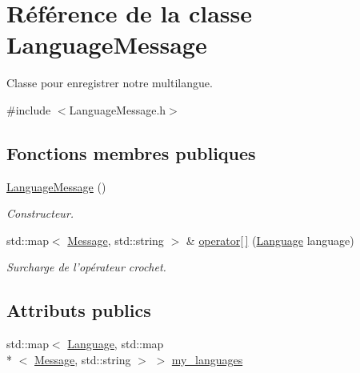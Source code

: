 \hypertarget{class_language_message}{\section{Référence de la classe Language\-Message}
\label{class_language_message}
}


Classe pour enregistrer notre multilangue.  




{\ttfamily \#include $<$Language\-Message.\-h$>$}

\subsection*{Fonctions membres publiques}
\begin{DoxyCompactItemize}
\item 
\hyperlink{class_language_message_aed1448b1bcddacd0aa85ddeff0af8451}{Language\-Message} ()
\begin{DoxyCompactList}\small\item\em Constructeur. \end{DoxyCompactList}\item 
\hypertarget{class_language_message_a13dfa70f541da1eb2cd6eb3ea2aefc6f}{std\-::map$<$ \hyperlink{_constantes_8h_a4f09127c805cc1f5ee20e67db7b45efa}{Message}, std\-::string $>$ \& \hyperlink{class_language_message_a13dfa70f541da1eb2cd6eb3ea2aefc6f}{operator\mbox{[}$\,$\mbox{]}} (\hyperlink{_constantes_8h_a315ca917ad583797f709ea477dd28705}{Language} language)}\label{class_language_message_a13dfa70f541da1eb2cd6eb3ea2aefc6f}

\begin{DoxyCompactList}\small\item\em Surcharge de l'opérateur crochet. \end{DoxyCompactList}\end{DoxyCompactItemize}
\subsection*{Attributs publics}
\begin{DoxyCompactItemize}
\item 
std\-::map$<$ \hyperlink{_constantes_8h_a315ca917ad583797f709ea477dd28705}{Language}, std\-::map\\*
$<$ \hyperlink{_constantes_8h_a4f09127c805cc1f5ee20e67db7b45efa}{Message}, std\-::string $>$ $>$ \hyperlink{class_language_message_aed19151194189a85d29c9a2bbd4ff002}{my\-\_\-languages}
\end{DoxyCompactItemize}


